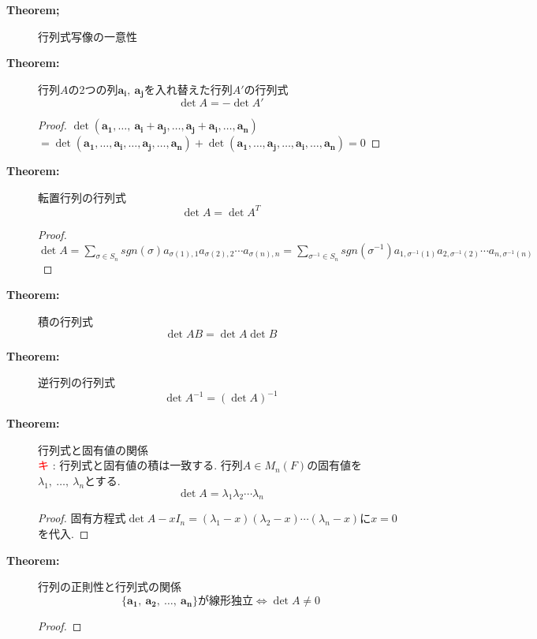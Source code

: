 \documentclass[dvipdfmx]{jsarticle}
\newcommand*{\point}{\textcircled{\textcolor{red}{\scriptsize キ}} }
\begin{document}
\begin{description}
        \item[\bf{Theorem;}] 行列式写像の一意性
            
        \item[\bf{Theorem:}] 行列$A$の2つの列$\bm{a_i},\ \bm{a_j}$を入れ替えた行列$A'$の行列式
            $$ \det A = - \det A' $$
            \begin{proof}
                $\det (\bm{a_1}, \dots,\ \bm{a_i}+\bm{a_j}, \dots, \bm{a_j}+\bm{a_i}, \dots, \bm{a_n} )$ \\
                $= \det (\bm{a_1},\dots , \bm{a_i}, \dots, \bm{a_j}, \dots, \bm{a_n} ) +  \det (\bm{a_1},\dots , \bm{a_j}, \dots, \bm{a_i}, \dots, \bm{a_n} ) = 0$
            \end{proof}
            

        \item[\bf{Theorem:}] 転置行列の行列式
            $$ \det A = \det A^T $$
            \begin{proof}
                $ \displaystyle{ \det A = \sum_{\sigma \in S_n} sgn(\sigma) a_{\sigma(1),1} a_{\sigma(2),2} \cdots a_{\sigma(n),n} = \sum_{\sigma^{-1} \in S_n} sgn(\sigma^{-1}) a_{1,\sigma^{-1}(1)} a_{2,\sigma^{-1}(2)} \cdots a_{n, \sigma^{-1}(n)} }$
            \end{proof}
        
        \item[\bf{Theorem:}] 積の行列式
            $$ \det AB = \det A \det B $$
        
        \item[\bf{Theorem:}] 逆行列の行列式
            $$ \det A^{-1} = (\det A)^{-1} $$

        \item[\bf{Theorem:}] 行列式と固有値の関係 \\
            \point : 行列式と固有値の積は一致する.
            行列$A \in M_n(F)$の固有値を$\lambda_1,\ \dots,\ \lambda_n$とする.
            $$ \det A = \lambda_1 \lambda_2 \cdots \lambda_n$$
            \begin{proof}
                固有方程式$\det A - x I_n = (\lambda_1 - x)(\lambda_2 - x) \cdots (\lambda_n - x) $に$x = 0$を代入.
            \end{proof}

        \item[\bf{Theorem:}] 行列の正則性と行列式の関係
        $$ \{ \bm{a_1},\ \bm{a_2},\ \dots,\ \bm{a_n} \} \text{が線形独立} \Leftrightarrow \det A \neq 0$$
            \begin{proof}
                

\end{proof}
\end{description}
\end{document}
